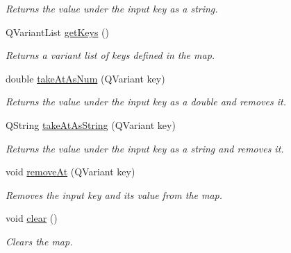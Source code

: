 \begin{DoxyCompactItemize}
\begin{DoxyCompactList}\small\item\em Returns the value under the input key as a string. \end{DoxyCompactList}\item 
Q\-Variant\-List \hyperlink{class_picto_1_1_variable_map_abe328194917c8bda235ba52deb94abdb}{get\-Keys} ()
\begin{DoxyCompactList}\small\item\em Returns a variant list of keys defined in the map. \end{DoxyCompactList}\item 
\hypertarget{class_picto_1_1_variable_map_a410e591a616c96be82aff5109d8bf742}{double \hyperlink{class_picto_1_1_variable_map_a410e591a616c96be82aff5109d8bf742}{take\-At\-As\-Num} (Q\-Variant key)}\label{class_picto_1_1_variable_map_a410e591a616c96be82aff5109d8bf742}

\begin{DoxyCompactList}\small\item\em Returns the value under the input key as a double and removes it. \end{DoxyCompactList}\item 
\hypertarget{class_picto_1_1_variable_map_ae2600c4149fb57cbaa2f1fea756228c9}{Q\-String \hyperlink{class_picto_1_1_variable_map_ae2600c4149fb57cbaa2f1fea756228c9}{take\-At\-As\-String} (Q\-Variant key)}\label{class_picto_1_1_variable_map_ae2600c4149fb57cbaa2f1fea756228c9}

\begin{DoxyCompactList}\small\item\em Returns the value under the input key as a string and removes it. \end{DoxyCompactList}\item 
\hypertarget{class_picto_1_1_variable_map_a2b11150c5e09b79d76a87e4cbcca08a5}{void \hyperlink{class_picto_1_1_variable_map_a2b11150c5e09b79d76a87e4cbcca08a5}{remove\-At} (Q\-Variant key)}\label{class_picto_1_1_variable_map_a2b11150c5e09b79d76a87e4cbcca08a5}

\begin{DoxyCompactList}\small\item\em Removes the input key and its value from the map. \end{DoxyCompactList}\item 
\hypertarget{class_picto_1_1_variable_map_a80f995d73789085574d49dffdafb7ef8}{void \hyperlink{class_picto_1_1_variable_map_a80f995d73789085574d49dffdafb7ef8}{clear} ()}\label{class_picto_1_1_variable_map_a80f995d73789085574d49dffdafb7ef8}

\begin{DoxyCompactList}\small\item\em Clears the map. \end{DoxyCompactList}\end{DoxyCompactItemize}
